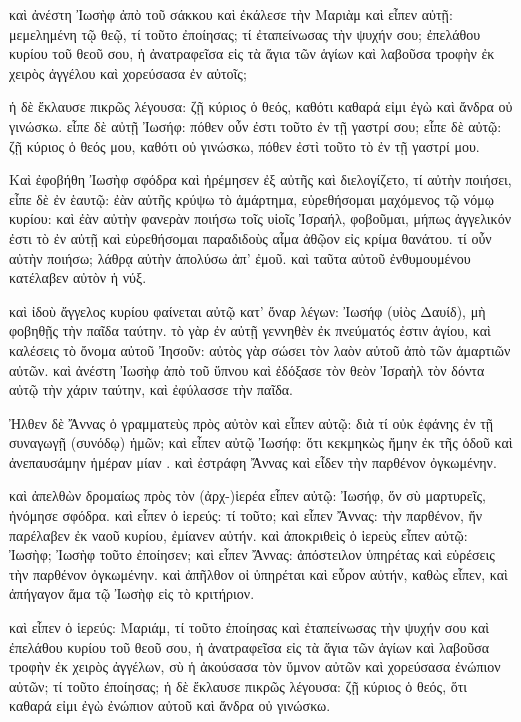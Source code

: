 \pend\pstart
καὶ ἀνέστη Ἰωσὴφ ἀπὸ τοῦ σάκκου καὶ ἐκάλεσε τὴν Μαριὰμ καὶ εἶπεν αὐτῇ: μεμελημένη τῷ θεῷ, τί τοῦτο ἐποίησας; τί ἐταπείνωσας τὴν ψυχήν σου; ἐπελάθου κυρίου τοῦ θεοῦ σου, ἡ ἀνατραφεῖσα εἰς τὰ ἅγια τῶν ἁγίων καὶ λαβοῦσα τροφὴν ἐκ χειρὸς ἀγγέλου καὶ χορεύσασα ἐν αὐτοῖς;

\pend\pstart
ἡ δὲ ἔκλαυσε πικρῶς λέγουσα: ζῇ κύριος ὁ θεός, καθότι καθαρά εἰμι ἐγὼ καὶ ἄνδρα οὐ γινώσκω. εἶπε δὲ αὐτῇ Ἰωσήφ: πόθεν οὖν ἐστι τοῦτο ἐν τῇ γαστρί σου; εἶπε δὲ αὐτῷ: ζῇ κύριος ὁ θεός μου, καθότι οὐ γινώσκω, πόθεν ἐστὶ τοῦτο τὸ ἐν τῇ γαστρί μου.

\pend\pstart
{}

\pend\setcounter{pstartL}{1}\pstart
Καὶ ἐφοβήθη Ἰωσὴφ σφόδρα καὶ ἠρέμησεν ἐξ αὐτῆς καὶ διελογίζετο, τί αὐτὴν ποιήσει, εἶπε δὲ ἐν ἑαυτῷ: ἐὰν αὐτῆς κρύψω τὸ ἁμάρτημα, εὑρεθήσομαι μαχόμενος τῷ νόμῳ κυρίου: καὶ ἐὰν αὐτὴν φανερὰν ποιήσω τοῖς υἱοῖς Ἰσραήλ, φοβοῦμαι, μήπως ἀγγελικόν ἐστι τὸ ἐν αὐτῇ καὶ εὑρεθήσομαι παραδιδοὺς αἷμα ἀθῷον εἰς κρίμα θανάτου. τί οὖν αὐτὴν ποιήσω; λάθρᾳ αὐτὴν ἀπολύσω ἀπ' ἐμοῦ. καὶ ταῦτα αὐτοῦ ἐνθυμουμένου κατέλαβεν αὐτὸν ἡ νύξ.

\pend\pstart
καὶ ἰδοὺ ἄγγελος κυρίου φαίνεται αὐτῷ κατ' ὄναρ λέγων: Ἰωσήφ (υἱὸς Δαυίδ), μὴ φοβηθῇς τὴν παῖδα ταύτην. τὸ γὰρ ἐν αὐτῇ γεννηθὲν ἐκ πνεύματός ἐστιν ἁγίου, καὶ καλέσεις τὸ ὄνομα αὐτοῦ Ἰησοῦν: αὐτὸς γὰρ σώσει τὸν λαὸν αὐτοῦ ἀπὸ τῶν ἁμαρτιῶν αὐτῶν. καὶ ἀνέστη Ἰωσὴφ ἀπὸ τοῦ ὕπνου καὶ ἐδόξασε τὸν θεὸν Ἰσραὴλ τὸν δόντα αὐτῷ τὴν χάριν ταύτην, καὶ ἐφύλασσε τὴν παῖδα.

\pend\pstart
{}

\pend\setcounter{pstartL}{1}\pstart
Ἠλθεν δὲ Ἄννας ὁ γραμματεὺς πρὸς αὐτὸν καὶ εἶπεν αὐτῷ: διὰ τί οὐκ ἐφάνης ἐν τῇ συναγωγῇ (συνόδῳ) ἡμῶν; καὶ εἶπεν αὐτῷ Ἰωσήφ: ὅτι κεκμηκὼς ἤμην ἐκ τῆς ὁδοῦ καὶ ἀνεπαυσάμην ἡμέραν μίαν . καὶ ἐστράφη Ἄννας καὶ εἶδεν τὴν παρθένον ὀγκωμένην.

\pend\pstart
καὶ ἀπελθὼν δρομαίως πρὸς τὸν (ἀρχ-)ἱερέα εἶπεν αὐτῷ: Ἰωσήφ, ὅν σὺ μαρτυρεῖς, ἠνόμησε σφόδρα. καὶ εἶπεν ὁ ἱερεύς: τί τοῦτο; καὶ εἶπεν Ἄννας: τὴν παρθένον, ἥν παρέλαβεν ἐκ ναοῦ κυρίου, ἐμίανεν αὐτήν. καὶ ἀποκριθεὶς ὁ ἱερεὺς εἶπεν αὐτῷ: Ἰωσὴφ; Ἰωσὴφ τοῦτο ἐποίησεν; καὶ εἶπεν Ἄννας: ἀπόστειλον ὑπηρέτας καὶ εὑρέσεις τὴν παρθένον ὀγκωμένην. καὶ ἀπῆλθον οἱ ὑπηρέται καὶ εὗρον αὐτήν, καθὼς εἶπεν, καὶ ἀπήγαγον ἅμα τῷ Ἰωσὴφ εἰς τὸ κριτήριον.

\pend\pstart
καὶ εἶπεν ὁ ἱερεύς: Μαριάμ, τί τοῦτο ἐποίησας καὶ ἐταπείνωσας τὴν ψυχήν σου καὶ ἐπελάθου κυρίου τοῦ θεοῦ σου, ἡ ἀνατραφεῖσα εἰς τὰ ἅγια τῶν ἁγίων καὶ λαβοῦσα τροφὴν ἐκ χειρὸς ἀγγέλων, σὺ ἡ ἀκούσασα τὸν ὕμνον αὐτῶν καὶ χορεύσασα ἐνώπιον αὐτῶν; τί τοῦτο ἐποίησας; ἡ δὲ ἔκλαυσε πικρῶς λέγουσα: ζῇ κύριος ὁ θεός, ὅτι καθαρά εἰμι ἐγὼ ἐνώπιον αὐτοῦ καὶ ἄνδρα οὐ γινώσκω.


